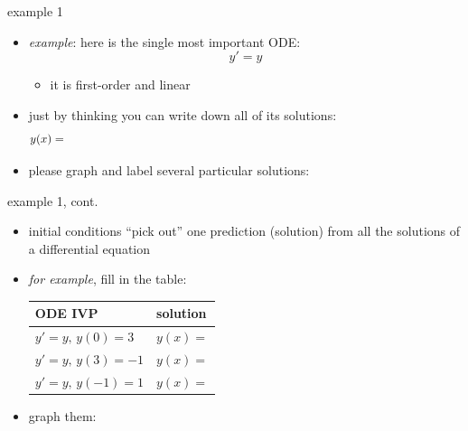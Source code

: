\documentclass{beamer}
\begin{document}
\begin{frame}{example 1}

\begin{itemize}
\item \emph{example}: here is the single most important ODE:
    $$y' = y$$

\vspace{-4mm}
    \begin{itemize}
    \item it is first-order and linear
    \end{itemize}
\item just by thinking you can write down all of its solutions:
    $$y(x) = \hspace{5.0in}$$
\item please graph and label several particular solutions:

\end{itemize}

\vfill
\end{frame}


\begin{frame}{example 1, cont.}

\begin{itemize}
\item initial conditions ``pick out'' one prediction (solution) from all the solutions of a differential equation
\item \emph{for example}, fill in the table:

\begin{tabular}{l|l}
ODE IVP & solution \phantom{sldafjdlkajf sd adsfkj asdf} \\ \hline
$y' = y, \, y(0)=3$ & $y(x)=$ \phantom{$\Big|$} \\ \hline
$y' = y, \, y(3)=-1$ & $y(x)=$ \phantom{$\Big|$} \\ \hline
$y' = y, \, y(-1)=1$ & $y(x)=$ \phantom{$\Big|$} \\ \hline
\end{tabular}

\smallskip
\item graph them:

\vspace{-5mm}
\end{itemize}

\vfill
\end{frame}
\end{document}
